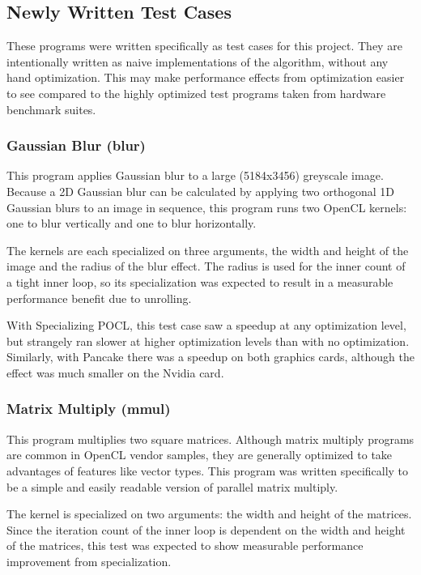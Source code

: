 \documentclass{acm_proc_article-sp}
\begin{document}
\subsection{Newly Written Test Cases}

These programs were written specifically as test cases for this project. They
are intentionally written as naive implementations of the algorithm, without
any hand optimization. This may make performance effects from optimization
easier to see compared to the highly optimized test programs taken from
hardware benchmark suites.

\subsubsection{Gaussian Blur (blur)}

This program applies Gaussian blur to a large (5184x3456) greyscale image.
Because a 2D Gaussian blur can be calculated by applying two orthogonal 1D
Gaussian blurs to an image in sequence, this program runs two OpenCL kernels:
one to blur vertically and one to blur horizontally.

The kernels are each specialized on three arguments, the width and height of
the image and the radius of the blur effect. The radius is used for the inner
count of a tight inner loop, so its specialization was expected to result in a
measurable performance benefit due to unrolling.

With Specializing POCL, this test case saw a speedup at any optimization level,
but strangely ran slower at higher optimization levels than with no
optimization. Similarly, with Pancake there was a speedup on both graphics
cards, although the effect was much smaller on the Nvidia card.

\subsubsection{Matrix Multiply (mmul)}

This program multiplies two square matrices. Although matrix multiply programs
are common in OpenCL vendor samples, they are generally optimized to take
advantages of features like vector types. This program was written specifically
to be a simple and easily readable version of parallel matrix multiply.

The kernel is specialized on two arguments: the width and height of the
matrices. Since the iteration count of the inner loop is dependent on the width
and height of the matrices, this test was expected to show measurable
performance improvement from specialization.
\end{document}
